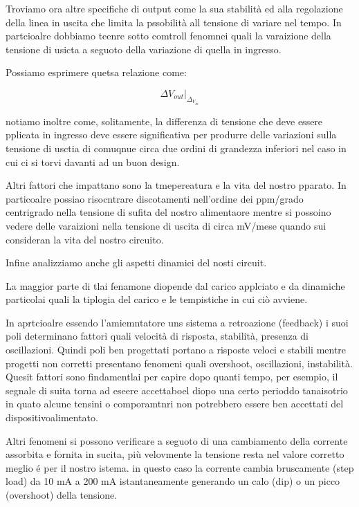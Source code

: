 \documentclass[../main.tex]{subfiles}
\begin{document}
Troviamo ora altre specifiche di output come la sua stabilità ed alla regolazione della linea in uscita che limita la pssobilità all tensione di variare nel tempo.
In partcioalre dobbiamo teenre sotto comtroll fenomnei quali la varaizione della tensione di usicta a seguoto della variazione di quella in ingresso.

Possiamo esprimere quetsa relazione come:

\begin{equation}
	\Delta V_{out} \big|_{\Delta_{V_{in}}}
\end{equation}

notiamo inoltre come, solitamente, la differenza di tensione che deve essere pplicata in ingresso deve essere significativa per produrre delle variazioni sulla tensione di usctia di comuqnue circa due ordini di grandezza inferiori nel caso in cui ci si torvi davanti ad un buon design.

Altri fattori che impattano sono la tmepereatura e la vita del nostro pparato.
In particoalre possiao risocntrare discotamenti nell'ordine dei ppm/grado centrigrado nella tensione di sufita del nostro alimentaore mentre si possoino vedere delle varaizioni nella tensione di uscita di circa mV/mese quando sui consideran la vita del nostro circuito.

Infine analizziamo anche gli aspetti dinamici del nosti circuit.

La maggior parte di tlai fenamone diopende dal carico applciato e da dinamiche particolai quali la tiplogia del carico e le tempistiche in cui ciò avviene.

In aprtcioalre essendo l'amiemntatore uns sistema a retroazione (feedback) i suoi poli determinano fattori quali velocità di risposta, stabilità, presenza di oscillazioni.
Quindi poli ben progettati portano a risposte veloci e stabili mentre progetti non corretti presentano fenomeni quali overshoot, oscillazioni, instabilità. Quesit fattori sono findamentlai per capire dopo quanti tempo, per esempio, il segnale di suita torna ad eseere accettaboel diopo una certo perioddo tanaisotrio in quato alcune tensini o comporamtnri non potrebbero essere ben accettati del dispositivoalimentato.

Altri fenomeni si possono verificare a seguoto di una cambiamento della corrente assorbita e fornita in sucita, più velovmente la tensione resta nel valore corretto meglio é per il nostro istema. in questo caso la corrente cambia bruscamente (step load) da 10 mA a 200 mA istantaneamente generando un calo (dip) o un picco (overshoot) della tensione.
\end{document}
